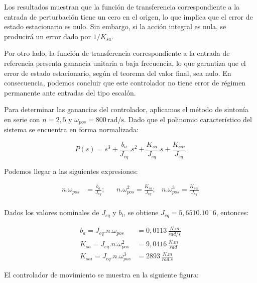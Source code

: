 \documentclass{article}
\begin{document}
Los resultados muestran que la función de transferencia correspondiente a la entrada de perturbación 
tiene un cero en el origen, lo que implica que el error de estado estacionario es nulo. Sin embargo, 
si la acción integral es nula, se producirá un error dado por $1/K_{sa}$.

Por otro lado, la función de transferencia correspondiente a la entrada de referencia presenta ganancia 
unitaria a baja frecuencia, lo que garantiza que el error de estado estacionario, según el teorema del 
valor final, sea nulo. En consecuencia, podemos concluir que este controlador no tiene error de régimen 
permanente ante entradas del tipo escalón.

Para determinar las ganancias del controlador, aplicamos el método de sintonía en serie con $n = 2,5$ y 
$\omega_{pos} = 800 \, \text{rad/s}$. Dado que el polinomio característico del sistema se encuentra en 
forma normalizada:

\begin{equation}
    P(s) = s^3 + \frac{b_a}{J_{eq}}.s^2 + \frac{K_{sa}}{J_{eq}}.s + \frac{K_{sai}}{J_{eq}}
\end{equation}

Podemos llegar a las siguientes expresiones:

\begin{align*}
    n.\omega_{pos} &= \frac{b_a}{J_{eq}}; & &n.\omega_{pos}^2 = \frac{K_{sa}}{J_{eq}}; & n.\omega_{pos}^3 = \frac{K_{sai}}{J_{eq}} \\
\end{align*}

Dados los valores nominales de $J_{eq}$ y $b_l$, se obtiene $J_{eq} = 5,6510.10^-6$, entonces:

\begin{align*}
    b_a = J_{eq}.n.\omega_{pos} &= 0,0113\, \frac{N.m}{rad/s} \\ 
    K_{sa} = J_{eq}.n.\omega_{pos}^2 &= 9,0416\, \frac{N.m}{rad} \\
    K_{sai} = J_{eq}.n.\omega_{pos}^3 &= 2893\, \frac{N.m}{rad.s}
\end{align*}

El controlador de movimiento se muestra en la siguiente figura: 

\end{document}
